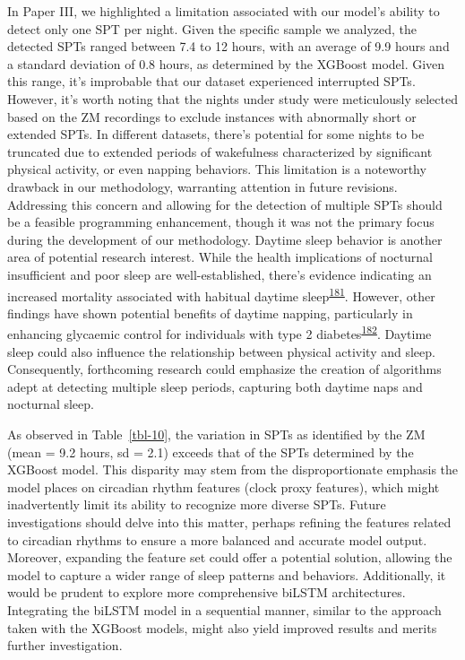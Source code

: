 \documentclass[
  10pt,
]{scrbook}
\begin{document}
In Paper III, we highlighted a limitation associated with our model's
ability to detect only one SPT per night. Given the specific sample we
analyzed, the detected SPTs ranged between 7.4 to 12 hours, with an
average of 9.9 hours and a standard deviation of 0.8 hours, as
determined by the XGBoost model. Given this range, it's improbable that
our dataset experienced interrupted SPTs. However, it's worth noting
that the nights under study were meticulously selected based on the ZM
recordings to exclude instances with abnormally short or extended SPTs.
In different datasets, there's potential for some nights to be truncated
due to extended periods of wakefulness characterized by significant
physical activity, or even napping behaviors. This limitation is a
noteworthy drawback in our methodology, warranting attention in future
revisions. Addressing this concern and allowing for the detection of
multiple SPTs should be a feasible programming enhancement, though it
was not the primary focus during the development of our methodology.
Daytime sleep behavior is another area of potential research interest.
While the health implications of nocturnal insufficient and poor sleep
are well-established, there's evidence indicating an increased mortality
associated with habitual daytime
sleep\textsuperscript{\protect\hyperlink{ref-burazeri_2003}{181}}.
However, other findings have shown potential benefits of daytime
napping, particularly in enhancing glycaemic control for individuals
with type 2
diabetes\textsuperscript{\protect\hyperlink{ref-makino_2018}{182}}.
Daytime sleep could also influence the relationship between physical
activity and sleep. Consequently, forthcoming research could emphasize
the creation of algorithms adept at detecting multiple sleep periods,
capturing both daytime naps and nocturnal sleep.

As observed in Table~\ref{tbl-10}, the variation in SPTs as identified
by the ZM (mean = 9.2 hours, sd = 2.1) exceeds that of the SPTs
determined by the XGBoost model. This disparity may stem from the
disproportionate emphasis the model places on circadian rhythm features
(clock proxy features), which might inadvertently limit its ability to
recognize more diverse SPTs. Future investigations should delve into
this matter, perhaps refining the features related to circadian rhythms
to ensure a more balanced and accurate model output. Moreover, expanding
the feature set could offer a potential solution, allowing the model to
capture a wider range of sleep patterns and behaviors. Additionally, it
would be prudent to explore more comprehensive biLSTM architectures.
Integrating the biLSTM model in a sequential manner, similar to the
approach taken with the XGBoost models, might also yield improved
results and merits further investigation.
\end{document}
